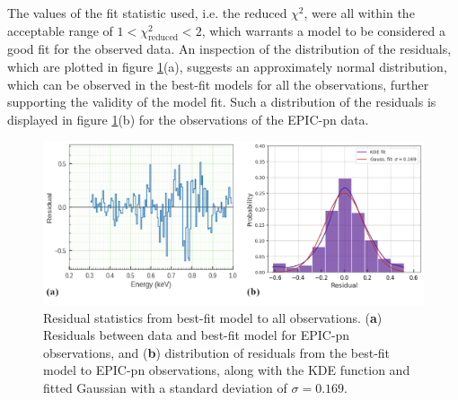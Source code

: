 	The values of the fit statistic used, i.e. the reduced $\chi^2$, were all within the acceptable range of $1<\chi^2_\text{reduced}<2$, which warrants a model to be considered a good fit for the observed data. An inspection of the distribution of the residuals, which are plotted in figure \ref{fig:all-obs:resid-stats}(a), suggests an approximately normal distribution, which can be observed in the best-fit models for all the observations, further supporting the validity of the model fit. Such a distribution of the residuals is displayed in figure \ref{fig:all-obs:resid-stats}(b) for the observations of the EPIC-pn data.
	
	\begin{figure}[!htb]
        \centering
        \includegraphics[width=\textwidth]{figures/resid/mr-vel-0111150101-pn_stats.png}
        \caption{Residual statistics from best-fit model to all observations. (\textbf{a}) Residuals between data and best-fit model for EPIC-pn observations, and (\textbf{b}) distribution of residuals from the best-fit model to EPIC-pn observations, along with the KDE function and fitted Gaussian with a standard deviation of $\sigma=0.169$.}
        \label{fig:all-obs:resid-stats}
    \end{figure}
	
    
